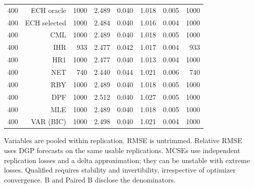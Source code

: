\begin{table}[p]
\begin{tabular}{rrrrrrrr}
400 & ECH oracle & 1000 & 2.489 & 0.040 & 1.018 & 0.005 & 1000 \\
400 & ECH selected & 1000 & 2.484 & 0.040 & 1.016 & 0.004 & 1000 \\
400 & CML & 1000 & 2.489 & 0.040 & 1.018 & 0.005 & 1000 \\
400 & IHR &  933 & 2.477 & 0.042 & 1.017 & 0.004 &  933 \\
400 & HR1 & 1000 & 2.477 & 0.040 & 1.013 & 0.004 & 1000 \\
400 & NET &  740 & 2.440 & 0.044 & 1.021 & 0.006 &  740 \\
400 & RBY & 1000 & 2.489 & 0.040 & 1.018 & 0.005 & 1000 \\
400 & DPF & 1000 & 2.512 & 0.040 & 1.027 & 0.005 & 1000 \\
400 & MLE & 1000 & 2.489 & 0.040 & 1.018 & 0.005 & 1000 \\
400 & VAR (BIC) & 1000 & 2.498 & 0.040 & 1.021 & 0.004 & 1000 \\
\bottomrule\end{tabular}
\par\medskip
\begin{minipage}{0.98\linewidth}\footnotesize Variables are pooled within replication. RMSE is untrimmed. Relative RMSE uses DGP forecasts on the same usable replications. MCSEs use independent replication losses and a delta approximation; they can be unstable with extreme losses. Qualified requires stability and invertibility, irrespective of optimizer convergence. B and Paired B disclose the denominators.\end{minipage}
\end{table}
